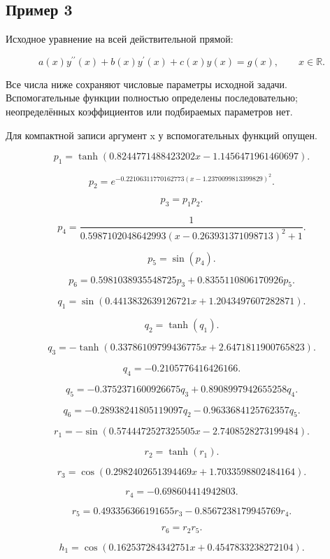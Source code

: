 \subsection*{Пример 3}

Исходное уравнение на всей действительной прямой:

\[a(x)y^{\prime\prime}(x)+b(x)y^\prime(x)+c(x)y(x)=g(x),\qquad x\in\mathbb R.\]

Все числа ниже сохраняют числовые параметры исходной задачи. Вспомогательные функции полностью определены последовательно; неопределённых коэффициентов или подбираемых параметров нет.

Для компактной записи аргумент x у вспомогательных функций опущен.

\[p_{1}=\tanh{\left(0.8244771488423202 x - 1.1456471961460697 \right)}.\]

\[p_{2}=e^{- 0.22106311770162773 \left(x - 1.2370099813399829\right)^{2}}.\]

\[p_{3}=p_{1} p_{2}.\]

\[p_{4}=\frac{1}{0.5987102048642993 \left(x - 0.263931371098713\right)^{2} + 1}.\]

\[p_{5}=\sin{\left(p_{4} \right)}.\]

\[p_{6}=0.5981038935548725 p_{3} + 0.8355110806170926 p_{5}.\]

\[q_{1}=\sin{\left(0.4413832639126721 x + 1.2043497607282871 \right)}.\]

\[q_{2}=\tanh{\left(q_{1} \right)}.\]

\[q_{3}=- \tanh{\left(0.33786109799436775 x + 2.6471811900765823 \right)}.\]

\[q_{4}=-0.2105776416426166.\]

\[q_{5}=- 0.3752371600926675 q_{3} + 0.8908997942655258 q_{4}.\]

\[q_{6}=- 0.28938241805119097 q_{2} - 0.9633684125762357 q_{5}.\]

\[r_{1}=- \sin{\left(0.5744472527325505 x - 2.7408528273199484 \right)}.\]

\[r_{2}=\tanh{\left(r_{1} \right)}.\]

\[r_{3}=\cos{\left(0.2982402651394469 x + 1.7033598802484164 \right)}.\]

\[r_{4}=-0.698604414942803.\]

\[r_{5}=0.493356366191655 r_{3} - 0.8567238179945769 r_{4}.\]

\[r_{6}=r_{2} r_{5}.\]

\[h_{1}=\cos{\left(0.162537284342751 x + 0.4547833238272104 \right)}.\]

